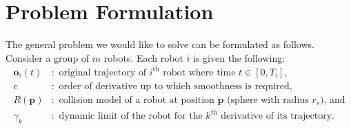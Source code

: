 \documentclass{svproc}
\newcommand{\vp}{\mathbf{p}}
\newcommand{\vo}{\mathbf{o}}
\newcommand{\cO}{\mathcal{O}}
\renewcommand{\th}{^{\text{th}}}
\begin{document}
\section{Problem Formulation} \label{problemFormulation}
The general problem we would like to solve can be formulated as follows. 
Consider a group of $m$ robots. Each robot $i$ is given the following:
\begin{align*}
    \vo_i(t)&:\text{ original trajectory of $i\th$ robot where time } t\in[0,T_i],\\
    c&:\text{ order of derivative up to which smoothness is required},\\
    R(\vp)&:\text{ collision model of a robot at position $\vp$ (sphere with radius $r_s$), and}\\
    \gamma_k&: \text{ dynamic limit of the robot for the $k\th$ derivative of its trajectory}.%
\end{align*}
\end{document}
